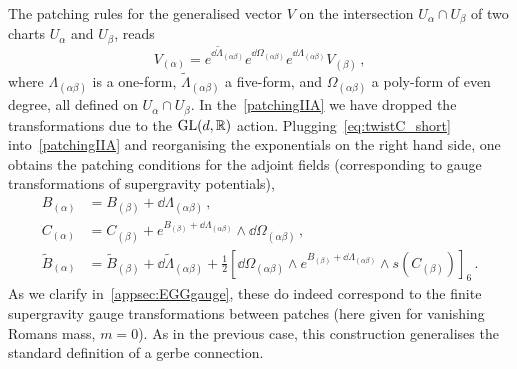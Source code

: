 \documentclass[debug]{phd}
\begin{document}
The patching rules for the generalised vector $V$ on the intersection $U_\alpha \cap U_\beta$ of two charts $U_\alpha$ and $U_\beta$, reads 
							\begin{equation}\label{patchingIIA}
								V_{(\alpha)} = e^{\dd \tilde{\Lambda}_{(\alpha\beta)}}e^{\dd \Omega_{(\alpha\beta)}} e^{\dd \Lambda_{(\alpha\beta)}} V_{(\beta)}\, ,
							\end{equation}
					where $\Lambda_{(\alpha \beta)}$ is a one-form, $\tilde\Lambda_{(\alpha \beta)}$ a five-form, and $\Omega_{(\alpha \beta)}$ a poly-form of even degree, all defined on $U_{\alpha} \cap U_{\beta}$.
					In the~\eqref{patchingIIA} we have dropped the transformations due to the $\mathrm{GL}(d,\mathbb{R})$ action.
Plugging~\eqref{eq:twistC_short} into~\eqref{patchingIIA} and reorganising the exponentials on the right hand side, one obtains the patching conditions for the adjoint fields (corresponding to gauge transformations of supergravity potentials),
							\begin{equation}\label{eq:gauge-field-patchingmassless}
								\begin{split}
									B_{(\alpha)} &= B_{(\beta)} + \dd \Lambda_{(\alpha\beta)} \, , \\
									C_{(\alpha)} &= C_{(\beta)} + e^{B_{(\beta)} +\dd \Lambda_{(\alpha\beta)}} \wedge \dd \Omega_{(\alpha\beta)} \, , \\
									\tilde{B}_{(\alpha)} &= \tilde{B}_{(\beta)} + \dd \tilde \Lambda_{(\alpha\beta)} + \tfrac{1}{2} \left[ \dd \Omega_{(\alpha\beta)} \wedge e^{B_{(\beta)} + \dd \Lambda_{(\alpha\beta)}}\wedge s(C_{(\beta)}) \right]_6 \, .
		 						\end{split}
							\end{equation}
					As we clarify in~\cref{appsec:EGGgauge}, these do indeed correspond to the finite supergravity gauge transformations between patches (here given for vanishing Romans mass, $m=0$). 
					As in the previous case, this construction generalises the standard definition of a gerbe connection.		
					
					
											
\end{document}
